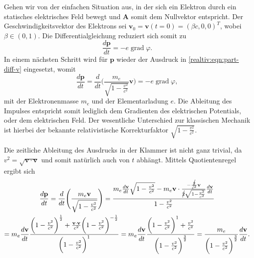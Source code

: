\begin{beispiel}
\label{realtiv:bsp:teilchen-konst-e-feld}
Gehen wir von der einfachen Situation aus,
in der sich ein Elektron durch ein statisches
elektrisches Feld bewegt und \(\mathbf{A}\)
somit dem Nullvektor entspricht.
Der Geschwindigkeitsvektor des Elektrons sei
\(\mathbf{v}_0 = \mathbf{v}(t=0) =(\beta c, 0, 0)^T\), wobei
\(\beta \in (0, 1)\).
Die Differentialgleichung reduziert sich somit zu
\begin{equation}
    \frac{d\mathbf{p}}{dt} =
    - e \operatorname{grad} \varphi.
    \label{relativ:eqn:euler-lagrange-bsp-1}
\end{equation}
In einem nächsten Schritt wird für \(\mathbf{p}\)
wieder der Ausdruck in \eqref{realtiv:eqn:part-diff-v} eingesetzt,
womit
\begin{equation}
    \frac{d\mathbf{p}}{dt} =
    \frac{d}{dt} \Biggl(\frac{m_e}{\sqrt{1-\frac{v^2}{c^2}}} \mathbf{v}\Biggr) =
    - e \operatorname{grad} \varphi,
\end{equation}
mit der Elektronenmasse \(m_e\) und der Elementarladung \(e\).
Die Ableitung des Impulses entspricht somit lediglich
dem Gradienten des elektrischen Potentials, oder dem elektrischen Feld.
Der wesentliche Unterschied zur klassischen Mechanik ist hierbei
der bekannte relativistische Korrekturfaktor
\(\sqrt{1-\frac{v^2}{c^2}}\).

Die zeitliche Ableitung des Ausdrucks in der Klammer ist nicht ganz trivial,
da \(v^2=\sqrt{\mathbf{v}\cdot\mathbf{v}}\)
und somit natürlich auch von \(t\) abhängt.
Mittels Quotientenregel ergibt sich
\begin{multline*}
    \frac{d\mathbf{p}}{dt}
    = \frac{d}{dt} \Biggl(\frac{m_e \mathbf{v}}{\sqrt{1-\frac{v^2}{c^2}}}\Biggr)
    = \frac{m_e\frac{d\mathbf{v}}{dt}\sqrt{1-\frac{v^2}{c^2}}
    -m_e\mathbf{v}\cdot\frac{-\frac{\cancel{2}}{c^2}\mathbf{v}}{\cancel{2}\sqrt{1-\frac{v^2}{c^2}}}
    \frac{d\mathbf{v}}{dt}}{1-\frac{v^2}{c^2}}\\
    = m_e\frac{d\mathbf{v}}{dt}\frac{\biggl(1-\frac{v^2}{c^2}\biggr)^\frac{1}{2}
    +\frac{\mathbf{v}\cdot\mathbf{v}}{c^2} \biggl(1-\frac{v^2}{c^2}\biggr)^{-\frac{1}{2}}}
    {\biggl(1-\frac{v^2}{c^2}\biggr)^1}
    = m_e\frac{d\mathbf{v}}{dt}\frac{\biggl(1-\frac{v^2}{c^2}\biggr)^1
    +\frac{v^2}{c^2}}{\biggl(1-\frac{v^2}{c^2}\biggr)^\frac{3}{2}}
    = \frac{m_e}{\biggl(1-\frac{v^2}{c^2}\biggr)^\frac{3}{2}}\frac{d\mathbf{v}}{dt}.
\end{multline*}


\end{beispiel}
